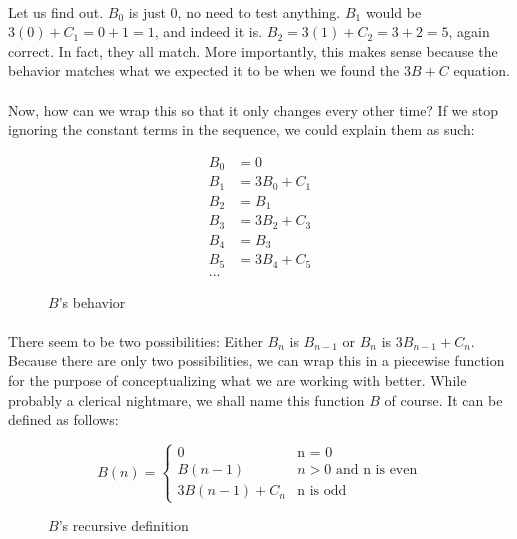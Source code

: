 \documentclass[12pt,letterpaper]{article}
\begin{document}
			\paragraph{} Let us find out. $B_0$ is just 0, no need to test anything. $B_1$ would be $3(0) + C_1 = 0 + 1 = 1$, and indeed it is. $B_2 = 3(1) + C_2 = 3 + 2 = 5$, again correct. In fact, they all match. More importantly, this makes sense because the behavior matches what we expected it to be when we found the $3B + C$ equation.
			
			\paragraph{} Now, how can we wrap this so that it only changes every other time? If we stop ignoring the constant terms in the sequence, we could explain them as such:
			
			\begin{figure}[h]
				\begin{align*}
					B_0 &= 0\\
					B_1 &= 3B_0 + C_1\\
					B_2 &= B_1\\
					B_3 &= 3B_2 + C_3\\
					B_4 &= B_3\\
					B_5 &= 3B_4 +C_5\\
					\text{...}&
				\end{align*}
				
				\caption{$B$'s behavior}
			\end{figure}
		
			\paragraph{} There seem to be two possibilities: Either $B_n$ is $B_{n-1}$ or $B_n$ is $3B_{n-1} + C_n$. Because there are only two possibilities, we can wrap this in a piecewise function for the purpose of conceptualizing what we are working with better. While probably a clerical nightmare, we shall name this function $B$ of course. It can be defined as follows:
			
			\begin{figure}[h]
				\begin{equation*}
					B(n) = \begin{cases}
						0 &\text{n = 0}\\
						B(n - 1) &n > 0 \text{ and n is even}\\
						3B(n - 1) + C_n &\text{n is odd}
					\end{cases}
				\end{equation*}
				
				\caption{$B$'s recursive definition}
				\label{function:bRecursive}
			\end{figure}
		
\end{document}
